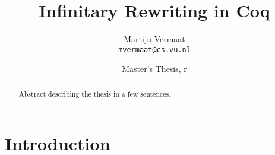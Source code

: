 \documentclass[a4paper,11pt]{article}
\title{Infinitary Rewriting in Coq}
\author{Martijn Vermaat\\[0.3em]
  \href{mailto:mvermaat@cs.vu.nl}{\texttt{mvermaat@cs.vu.nl}}
}
\date{Master's Thesis, r\svnrev}
\begin{document}
\maketitle


\begin{abstract}
  Abstract describing the thesis in a few sentences.
\end{abstract}


\section{Introduction}\label{sec:introduction}


\pagebreak




\end{document}
